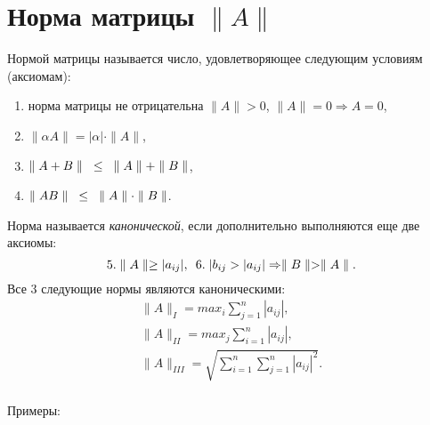 \documentclass[a4paper,11pt]{article}
\begin{document}
\section{Норма матрицы $\parallel A\parallel$}
Нормой матрицы называется число, удовлетворяющее следующим условиям (аксиомам):
\begin{enumerate}
  \item норма матрицы не отрицательна $\parallel A\parallel >0$, $\parallel A\parallel =0 \Rightarrow A=0$,
  \item $\parallel \alpha A\parallel = |\alpha|\cdot\parallel A\parallel$,
  \item $\parallel A+B\parallel \hspace{3mm}\le\hspace{3mm} \parallel A\parallel + \parallel B\parallel$,
  \item $\parallel AB\parallel \hspace{3mm}\le\hspace{3mm} \parallel A\parallel \cdot \parallel B\parallel$.
\end{enumerate}
Норма называется \textit{канонической}, если дополнительно выполняются еще две аксиомы:
\begin{equation*}
  5. \parallel A\parallel \ge |a_{ij}|, \hspace{5pt} 6. \hspace{1mm}|b_{ij}>|a_{ij}| \Rightarrow \parallel B\parallel > \parallel A \parallel.
\end{equation*}
Все 3 следующие нормы являются каноническими:
\begin{gather*}
  \parallel A\parallel_I = max_i \sum_{j=1}^n |a_{ij}|, \\
  \parallel A\parallel_{II} = max_j \sum_{i=1}^n |a_{ij}|, \\
  \parallel A \parallel_{III} = \sqrt{\sum_{i=1}^n \sum_{j=1}^n |a_{ij}|^2}.\\
\end{gather*}

Примеры:
\end{document}
